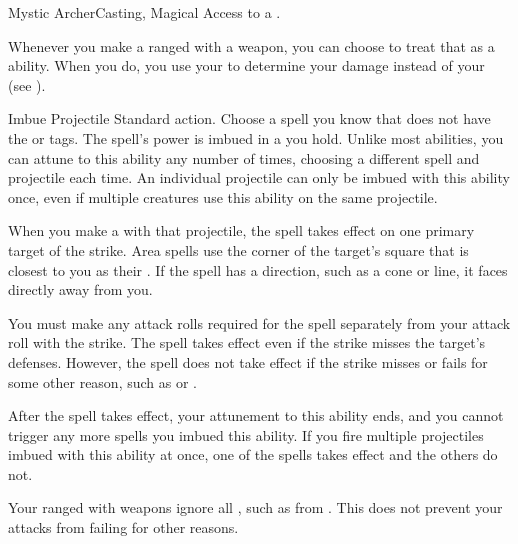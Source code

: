     \begin{magicalfeat}{Mystic Archer}{Casting, Magical}
        \featpre Access to a .

         Whenever you make a ranged  with a  weapon, you can choose to treat that as a \magical ability.
        When you do, you use your  to determine your damage instead of your  (see ).

        \begin{magicalattuneability}{Imbue Projectile}{}
            \abilityusagetime Standard action.
            \rankline
            Choose a spell you know that does not have the  or  tags.
            The spell's power is imbued in a  you hold.
            Unlike most  abilities, you can attune to this ability any number of times, choosing a different spell and projectile each time.
            An individual projectile can only be imbued with this ability once, even if multiple creatures use this ability on the same projectile.

            When you make a  with that projectile, the spell takes effect on one primary target of the strike.
            Area spells use the corner of the target's square that is closest to you as their .
            If the spell has a direction, such as a cone or line, it faces directly away from you.

            You must make any attack rolls required for the spell separately from your attack roll with the strike.
            The spell takes effect even if the strike misses the target's defenses.
            However, the spell does not take effect if the strike misses or fails for some other reason, such as  or .

            After the spell takes effect, your attunement to this ability ends, and you  cannot trigger any more spells you imbued this ability.
            If you fire multiple projectiles imbued with this ability at once, one of the spells takes effect and the others do not.
        \end{magicalattuneability}

         Your ranged  with  weapons ignore all , such as from .
        This does not prevent your attacks from failing for other reasons.


\end{magicalfeat}
